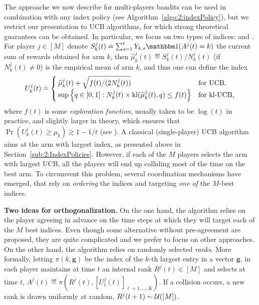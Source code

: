 The approache we now describe for multi-players bandits can be used in combination with any index policy (see Algorithm~\ref{algo:2:indexPolicy}), but we restrict our presentation to UCB algorithms, for which strong theoretical guarantees can be obtained. In particular, we focus on two types of indices:
\UCB{} \citep{Auer02}
and \klUCB{} \citep{KLUCBJournal}.
For player $j\in[M]$
%
denote $S_k^j(t) \eqdef \sum_{s=1}^t Y_{k,s} \indic(A^j(t) = k)$ the current sum of rewards obtained for arm $k$,
then $\widehat{\mu}_k^j(t) \eqdef S_k^j(t)/N_k^j(t)$ (if $N_k^j(t)\neq 0$) is the empirical mean of arm $k$, and thus one can define the index
\begin{equation}\label{eq:5:indexFor_UCB_klUCB}
  U_k^j(t) \overset{.}{=} \begin{cases}
      \widehat{\mu}_k^j(t)  + \sqrt{  f(t) / (2N_k^j(t))}
      &\text{for } \mathrm{UCB}, \\
      \sup\left\{ q \in [0, 1]: N_k^j(t)\times \mathrm{kl}(\widehat{\mu}_k^j(t), q) \leq f(t) \right\}
      &\text{for } \mathrm{kl}\text{-}\mathrm{UCB},
  \end{cases}
\end{equation}
where $f(t)$ is some \emph{exploration function}, usually taken to be $\log(t)$ in practice, and slightly larger in theory, which ensures that  $\Pr(U_k^j(t) \geq \mu_k) \gtrsim 1 - 1/t$ (see \cite{KLUCBJournal}).
A classical (single-player) UCB algorithm aims at the arm with largest index, as presented above in Section~\ref{sub:2:IndexPolicies}.
However, if each of the $M$ players selects the arm with largest UCB, all the players will end up colliding most of the time on the best arm.
To circumvent this problem, several coordination mechanisms have emerged, that rely on \emph{ordering} the indices and targeting \emph{one of} the $M$-best indices.


\textbf{Two ideas for orthogonalization.}
\label{par:5:twoIdeasOrthogonalization}
%
On the one hand, the \TDFS{} algorithm \citep{Zhao10} relies on the player agreeing in advance on the time steps at which they will target each of the $M$ best indices.
Even though some alternative without pre-agreement are proposed, they are quite complicated and we prefer to focus on other approaches.
%
On the other hand, the \rhoRand{} algorithm \citep{Anandkumar11} relies on randomly selected \emph{ranks}. %
%
More formally, letting $\pi(k,\mathbf{g})$ be the index of the $k$-th largest entry in a vector $\mathbf{g}$,
in \rhoRand{} each player maintains at time $t$ an internal rank $R^j(t)\in[M]$
and selects at time $t$,
$A^j(t) \eqdef \pi\left(R^j(t), [U^j_\ell(t)]_{\ell=1,\dots,K}\right)$.
If a collision occurs, a new rank is drawn uniformly at random, $R^j(t+1) \sim \mathcal{U}([M])$.


